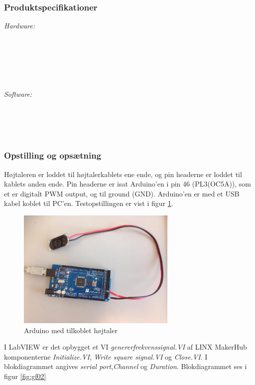 \subsubsection{Produktspecifikationer}

\textit{Hardware:}\\
		\\
		\hojtalerkabel\\
		\pins\\
		\arduino\\
		\PC\\
		\usbkabel\\
	
		\textit{Software:}\\
		\labview\\
		\visa\\
		\vi\\
		\ardsw\


\subsubsection{Opstilling og opsætning}

		Højtaleren er loddet til højtalerkablets ene ende, og pin headerne er loddet til kablets anden ende. 
		Pin headerne er isat Arduino'en i pin 46 (PL3(OC5A)), som et er digitalt PWM output, og til ground (GND). 
		Arduino'en er med et USB kabel koblet til PC'en. Testopstillingen er vist i figur \ref{fig:etha1}.\\ 
	  
			\begin{figure}[htb]
			\centering
				\includegraphics[width=3in]{haArduino}
				\caption{Arduino med tilkoblet højtaler}	
				\label{fig:etha1}
			\end{figure}

I LabVIEW er det opbygget et VI \textit{genererfrekvenssignal.VI} af LINX MakerHub komponenterne \textit{Initialize.VI}, \textit{Write square signal.VI} og \textit{Close.VI}. I blokdiagrammet angives \textit{serial port},\textit{Channel} og \textit{Duration}.  	Blokdiagrammet ses i figur \ref{fig:gf02} 

